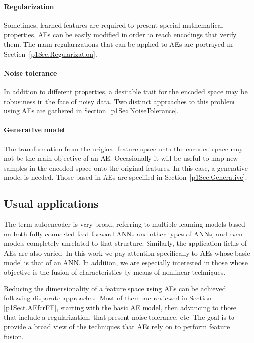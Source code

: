 \paragraph{Regularization}
Sometimes, learned features are required to present special mathematical properties. AEs can be easily modified in order to reach encodings that verify them. The main regularizations that can be applied to AEs are portrayed in Section~\ref{p1Sec.Regularization}.

\paragraph{Noise tolerance}
In addition to different properties, a desirable trait for the encoded space may be robustness in the face of noisy data. Two distinct approaches to this problem using AEs are gathered in Section~\ref{p1Sec.NoiseTolerance}.

\paragraph{Generative model}
The transformation from the original feature space onto the encoded space may not be the main objective of an AE. Occasionally it will be useful to map new samples in the encoded space onto the original features. In this case, a generative model is needed. Those based in AEs are specified in Section~\ref{p1Sec.Generative}.


\subsection{Usual applications}
The term autoencoder is very broad, referring to multiple learning models based on both fully-connected feed-forward ANNs and other types of ANNs, and even models completely unrelated to that structure. Similarly, the application fields of AEs are also varied.  In this work we pay attention specifically to AEs whose basic model is that of an ANN. In addition, we are especially interested in those whose objective is the fusion of characteristics by means of nonlinear techniques.

Reducing the dimensionality of a feature space using AEs can be achieved following disparate approaches. Most of them are reviewed in Section \ref{p1Sect.AEforFF}, starting with the basic AE model, then advancing to those that include a regularization, that present noise tolerance, etc. The goal is to provide a broad view of the techniques that AEs rely on to perform feature fusion.

